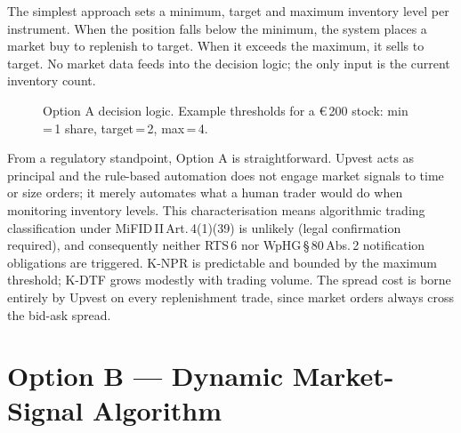 \documentclass[12pt,a4paper]{report}
\newcommand{\eur}{\euro\,}
\begin{document}
The simplest approach sets a minimum, target and maximum inventory level per instrument.
When the position falls below the minimum, the system places a market buy to replenish
to target. When it exceeds the maximum, it sells to target. No market data feeds into
the decision logic; the only input is the current inventory count.

\begin{figure}[H]
\centering
{}
\caption{Option A decision logic. Example thresholds for a \eur{}200 stock:
         min\,=\,1 share, target\,=\,2, max\,=\,4.}
\label{fig:optionA}
\end{figure}

From a regulatory standpoint, Option A is straightforward. Upvest acts as principal and
the rule-based automation does not engage market signals to time or size orders; it
merely automates what a human trader would do when monitoring inventory levels. This
characterisation means algorithmic trading classification under MiFID\,II\,Art.\,4(1)(39)
is unlikely (legal confirmation required), and consequently neither RTS\,6 nor
WpHG\,\S\,80\,Abs.\,2 notification obligations are triggered. K-NPR is predictable and
bounded by the maximum threshold; K-DTF grows modestly with trading volume. The spread
cost is borne entirely by Upvest on every replenishment trade, since market orders always
cross the bid-ask spread.

\section{Option B --- Dynamic Market-Signal Algorithm}
\end{document}
